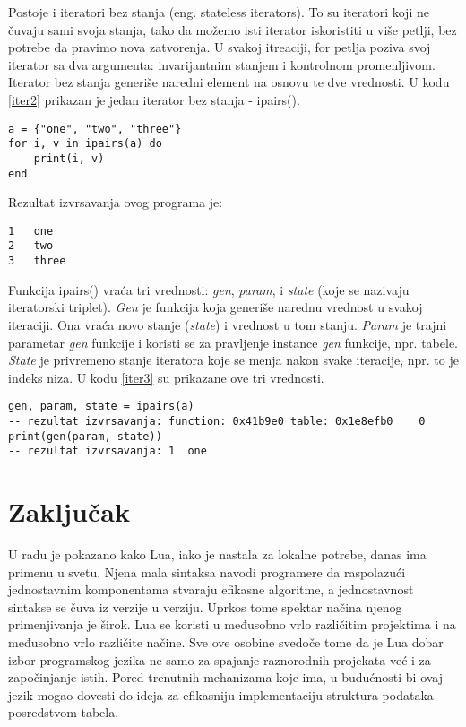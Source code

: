 \documentclass[a4paper]{article}
\begin{document}
Postoje i iteratori bez stanja (eng. stateless iterators). To su iteratori koji ne čuvaju sami svoja stanja, tako da možemo isti iterator iskoristiti u više petlji, bez potrebe da pravimo nova zatvorenja. U svakoj itreaciji, for petlja poziva svoj iterator sa dva argumenta: invarijantnim stanjem i kontrolnom promenljivom. Iterator bez stanja generiše naredni element na osnovu te dve vrednosti. U kodu \ref{iter2} prikazan je jedan iterator bez stanja - ipairs()\cite{bookProgInLua}.

\begin{lstlisting}[caption={Primer iteratora bez stanja},frame=single, label=iter2]
a = {"one", "two", "three"}
for i, v in ipairs(a) do
	print(i, v)
end
\end{lstlisting}
Rezultat izvrsavanja ovog programa je:
\begin{verbatim}
1	one
2	two
3	three
\end{verbatim}
Funkcija ipairs() vraća tri vrednosti: \textit{gen}, \textit{param}, i \textit{state} (koje se nazivaju iteratorski triplet). \textit{Gen} je funkcija koja generiše narednu vrednost u svakoj iteraciji. Ona vraća novo stanje (\textit{state}) i vrednost u tom stanju. \textit{Param} je trajni parametar \textit{gen} funkcije i koristi se za pravljenje instance \textit{gen} funkcije, npr. tabele. \textit{State} je privremeno stanje iteratora koje se menja nakon svake iteracije, npr. to je indeks niza\cite{luafun}. U kodu \ref{iter3} su prikazane ove tri vrednosti.
\begin{lstlisting}[caption={Primer iteratora bez stanja (nastavak)},frame=single, label=iter3]
gen, param, state = ipairs(a)
-- rezultat izvrsavanja: function: 0x41b9e0	table: 0x1e8efb0	0
print(gen(param, state))
-- rezultat izvrsavanja: 1	one
\end{lstlisting}



\section{Zaključak}
\label{sec:zakljucak}

U radu je pokazano kako Lua, iako je nastala za lokalne potrebe, danas ima primenu u svetu. Njena mala sintaksa navodi programere da raspolazući jednostavnim komponentama stvaraju efikasne algoritme, a jednostavnost sintakse se čuva iz verzije u verziju. Uprkos tome spektar načina njenog primenjivanja je širok. Lua se koristi u međusobno vrlo različitim projektima i na međusobno vrlo različite načine. Sve ove osobine svedoče tome da je Lua dobar izbor programskog jezika ne samo za spajanje raznorodnih projekata već i za započinjanje istih. Pored trenutnih mehanizama koje ima, u budućnosti bi ovaj jezik mogao dovesti do ideja za efikasniju implementaciju struktura podataka posredstvom tabela.
\end{document}
